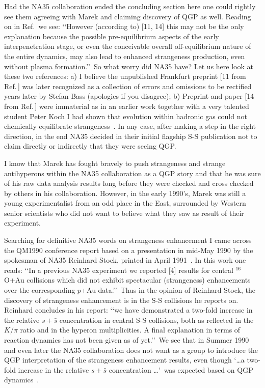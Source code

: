 \documentclass{appolb}
\begin{document}
Had the NA35 collaboration ended the concluding section here one could rightly see them agreeing with Marek and claiming discovery of QGP as well. Reading on in Ref.\,\cite{Bartke:1990cn} we see: \lq\lq However (according to) [11, 14] this may not be the only explanation because the possible pre-equilibrium aspects of the early interpenetration stage, or even the conceivable overall off-equilibrium nature of the entire dynamics, may also lead to enhanced strangeness production, even without plasma formation.\rq\rq\ So what worry did NA35 have? Let us here look at these two references: a) I believe the unpublished Frankfurt preprint [11 from Ref.\,\cite{Bartke:1990cn}] was later recognized as a collection of errors and omissions to be rectified years later by Stefan Bass (apologies if you disagree); b) Preprint and paper [14 from Ref.\,\cite{Bartke:1990cn}] were immaterial as in an earlier work together with a very talented student Peter Koch I had shown that evolution within hadronic gas could not chemically equilibrate strangeness~\cite{Koch:1984tz}. In any case, after making a step in the right direction, in the end NA35 decided in their initial flagship S-S publication not to claim directly or indirectly that they were seeing QGP.

I know that Marek has fought bravely to push strangeness and strange antihyperons within the NA35 collaboration as a QGP story and that he was sure of his raw data analysis results long before they were checked and cross checked by others in his collaboration. However, in the early 1990\rq s, Marek was still a young experimentalist from an odd place in the East, surrounded by Western senior scientists who did not want to believe what they saw as result of their experiment. 

Searching for definitive NA35 words on strangeness enhancement I came across the QM1990 conference report based on a presentation in mid-May 1990 by the spokesman of NA35 Reinhard Stock, printed in April 1991~\cite{Baechler:1991pp}. In this work one reads: \lq\lq In a previous NA35 experiment we reported [4] results for central $^{16}$O+Au collisions which did not exhibit spectacular (strangeness) enhancements over the corresponding $p$+Au data.\rq\rq\ Thus in the opinion of Reinhard Stock, the discovery of strangeness enhancement is in the S-S collisions he reports on. Reinhard concludes in his report: \lq\lq we have demonstrated a two-fold increase in the relative $s + \bar s$ concentration in central S-S collisions, both as reflected in the $K/\pi$ ratio and in the hyperon multiplicities. A final explanation in terms of reaction dynamics has not been given as of yet.\rq\rq\ We see that in Summer 1990 and even later the NA35 collaboration does not want as a group to introduce the QGP interpretation of the strangeness enhancement results, even though \lq \ldots  a two-fold increase in the relative $s + \bar s$ concentration \ldots\rq\ was expected based on QGP dynamics~\cite{Koch:1986ud}.
\end{document}
